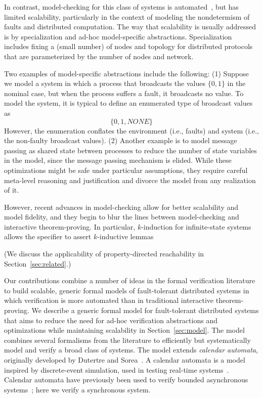 \documentclass{llncs/llncs}
\begin{document}
In contrast, model-checking for this class of systems is automated~\cite{}, but has limited scalability, particularly in the context of modeling the nondetermism of faults and distributed computation. The way that scalability is usually addressed is by specialization and ad-hoc model-specific abstractions. Specialization includes fixing a (small number) of nodes and topology for distributed protocols that are parameterized by the number of nodes and network.

Two examples of model-specific abstractions include the following: (1) Suppose we model a system in which a process that broadcasts the values $\{0, 1\}$ in the nominal case, but when the process suffers a fault, it broadcasts no value. To model the system, it is typical to define an enumerated type of broadcast values as $$\{0, 1, NONE\}$$ However, the enumeration conflates the environment (i.e., faults) and system (i.e., the non-faulty broadcast values). (2) Another example is to model message passing as shared state between processes to reduce the number of state variables in the model, since the message passing mechanism is elided. While these optimizations might be safe under particular assumptions, they require careful meta-level reasoning and justification and divorce the model from any realization of it.

However, recent advances in model-checking allow for better scalability and model fidelity, and they begin to blur the lines between model-checking and interactive theorem-proving. In particular, $k$-induction for infinite-state systems allows the specifier to assert $k$-inductive lemmas 

  (We discuss the applicability of property-directed reachability in Section~\ref{sec:related}.)

Our contributions combine a number of ideas in the formal verification literature to build scalable, generic formal models of fault-tolerant distributed systems in which verification is more automated than in traditional interactive theorem-proving. We describe a generic formal model for fault-tolerant distributed systems that aims to reduce the need for ad-hoc verification abstractions and optimizations while maintaining scalability in Section~\ref{sec:model}. The model combines several formalisms from the literature to efficiently but systematically model and verify a broad class of systems. The model extends \emph{calendar automata}, originally developed by Dutertre and Sorea~\cite{cal}. A calendar automata is a model inspired by discrete-event simulation, used in testing real-time systems~\cite{}.  Calendar automata have previously been used to verify bounded asynchronous systems~\cite{}; here we verify a synchronous system.
\end{document}
